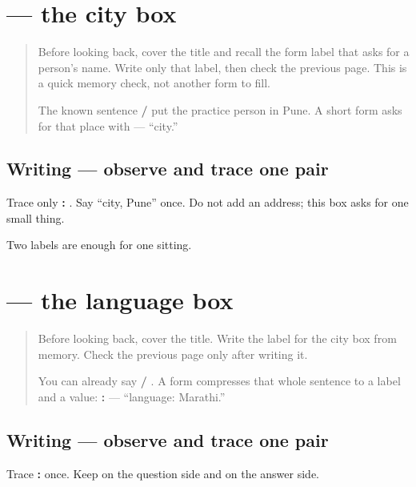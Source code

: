 \section[\texorpdfstring{\mr{शहर}: \mr{पुणे} (śahar: Puṇe)}{शहर: पुणे (śahar: Puṇe)}]{ — the city box}

\label{lesson:MR-A1F01-shahar}



\begin{quote}
Before looking back, cover the title and recall the form label that asks for a person's name. Write only that label, then check the previous page. This is a quick memory check, not another form to fill.

The known sentence \textbf{   / } put the practice person in Pune. A short form asks for that place with \textbf{} — “city.”
\end{quote}

\subsection*{Writing — observe and trace one pair}
Trace only \textbf{: }. Say “city, Pune” once. Do not add an address; this box asks for one small thing.

\begin{tcolorbox}[breakable,colback=teal!4,colframe=teal!35!black,title={Before you move on}]
Two labels are enough for one sitting.
\end{tcolorbox}
\section[\texorpdfstring{\mr{भाषा}: \mr{मराठी} (bhāṣā: marāṭhī)}{भाषा: मराठी (bhāṣā: marāṭhī)}]{ — the language box}

\label{lesson:MR-A1F01-bhasha}



\begin{quote}
Before looking back, cover the title. Write the label for the city box from memory. Check the previous page only after writing it.

You can already say \textbf{   / }. A form compresses that whole sentence to a label and a value: \textbf{: } — “language: Marathi.”
\end{quote}

\subsection*{Writing — observe and trace one pair}
Trace \textbf{: } once. Keep \textbf{} on the question side and \textbf{} on the answer side.

